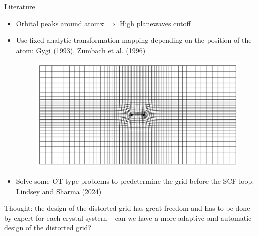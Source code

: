 \documentclass[aspectratio=169]{beamer}
\begin{document}
\begin{frame}{Literature}
	\begin{itemize}
		\item Orbital peaks around atomx $\Longrightarrow$ High planewaves cutoff
		\item Use fixed analytic transformation mapping depending on the position of the
		atom: Gygi (1993), Zumbach et al. (1996)
		\begin{figure}[h]
			\centering
			\includegraphics[width=.4\linewidth]{fig/adpative_grid.jpg}
		\end{figure}
		\item Solve some OT-type problems to predetermine the grid before the SCF
		loop: Lindsey and Sharma (2024)
	\end{itemize}
	
	Thought: the design of the distorted grid has great freedom and has to be done by expert 
	for each crystal system -- can we have a more adaptive and automatic design
	of the distorted grid?
\end{frame}
\end{document}
